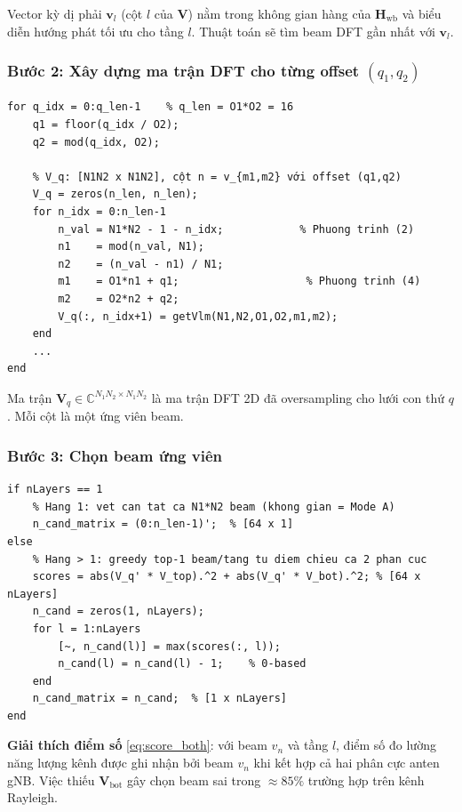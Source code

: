 \documentclass[11pt,a4paper]{article}
\begin{document}
\noindent Vector kỳ dị phải $\mathbf{v}_l$ (cột $l$ của $\mathbf{V}$) nằm trong
không gian hàng của $\mathbf{H}_\text{wb}$ và biểu diễn hướng phát tối ưu cho
tầng $l$. Thuật toán sẽ tìm beam DFT gần nhất với $\mathbf{v}_l$.

\subsubsection{Bước 2: Xây dựng ma trận DFT cho từng offset $(q_1, q_2)$}

\begin{lstlisting}
for q_idx = 0:q_len-1    % q_len = O1*O2 = 16
    q1 = floor(q_idx / O2);
    q2 = mod(q_idx, O2);

    % V_q: [N1N2 x N1N2], cột n = v_{m1,m2} với offset (q1,q2)
    V_q = zeros(n_len, n_len);
    for n_idx = 0:n_len-1
        n_val = N1*N2 - 1 - n_idx;            % Phuong trinh (2)
        n1    = mod(n_val, N1);
        n2    = (n_val - n1) / N1;
        m1    = O1*n1 + q1;                    % Phuong trinh (4)
        m2    = O2*n2 + q2;
        V_q(:, n_idx+1) = getVlm(N1,N2,O1,O2,m1,m2);
    end
    ...
end
\end{lstlisting}

\noindent Ma trận $\mathbf{V}_q \in \mathbb{C}^{N_1 N_2 \times N_1 N_2}$ là
ma trận DFT 2D đã oversampling cho lưới con thứ $q$. Mỗi cột là một ứng viên beam.

\subsubsection{Bước 3: Chọn beam ứng viên}

\begin{lstlisting}
if nLayers == 1
    % Hang 1: vet can tat ca N1*N2 beam (khong gian = Mode A)
    n_cand_matrix = (0:n_len-1)';  % [64 x 1]
else
    % Hang > 1: greedy top-1 beam/tang tu diem chieu ca 2 phan cuc
    scores = abs(V_q' * V_top).^2 + abs(V_q' * V_bot).^2; % [64 x nLayers]
    n_cand = zeros(1, nLayers);
    for l = 1:nLayers
        [~, n_cand(l)] = max(scores(:, l));
        n_cand(l) = n_cand(l) - 1;    % 0-based
    end
    n_cand_matrix = n_cand;  % [1 x nLayers]
end
\end{lstlisting}

\noindent\textbf{Giải thích điểm số} \eqref{eq:score_both}: với beam $v_n$ và
tầng $l$, điểm số đo lường năng lượng kênh được ghi nhận bởi beam $v_n$
khi kết hợp cả hai phân cực anten gNB. Việc thiếu $\mathbf{V}_\text{bot}$
gây chọn beam sai trong $\approx 85\%$ trường hợp trên kênh Rayleigh.
\end{document}
